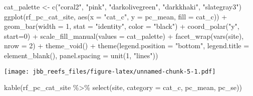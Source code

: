 \documentclass[
]{article}
\newenvironment{Shaded}{\begin{snugshade}}{\end{snugshade}}
\newcommand{\AttributeTok}[1]{\textcolor[rgb]{0.77,0.63,0.00}{#1}}
\newcommand{\DecValTok}[1]{\textcolor[rgb]{0.00,0.00,0.81}{#1}}
\newcommand{\FunctionTok}[1]{\textcolor[rgb]{0.00,0.00,0.00}{#1}}
\newcommand{\NormalTok}[1]{#1}
\newcommand{\OtherTok}[1]{\textcolor[rgb]{0.56,0.35,0.01}{#1}}
\newcommand{\SpecialCharTok}[1]{\textcolor[rgb]{0.00,0.00,0.00}{#1}}
\newcommand{\StringTok}[1]{\textcolor[rgb]{0.31,0.60,0.02}{#1}}
\begin{document}
\begin{Shaded}
\begin{Highlighting}[]
\NormalTok{cat\_palette }\OtherTok{\textless{}{-}} \FunctionTok{c}\NormalTok{(}\StringTok{"coral2"}\NormalTok{, }\StringTok{"pink"}\NormalTok{, }\StringTok{"darkolivegreen"}\NormalTok{, }\StringTok{"darkkhaki"}\NormalTok{, }\StringTok{"slategray3"}\NormalTok{)}
\FunctionTok{ggplot}\NormalTok{(rf\_pc\_cat\_site, }
       \FunctionTok{aes}\NormalTok{(}\AttributeTok{x =} \StringTok{"cat\_c"}\NormalTok{, }\AttributeTok{y =}\NormalTok{ pc\_mean, }\AttributeTok{fill =}\NormalTok{ cat\_c)) }\SpecialCharTok{+} 
  \FunctionTok{geom\_bar}\NormalTok{(}\AttributeTok{width =} \DecValTok{1}\NormalTok{, }\AttributeTok{stat =} \StringTok{"identity"}\NormalTok{, }\AttributeTok{color =} \StringTok{"black"}\NormalTok{) }\SpecialCharTok{+}
  \FunctionTok{coord\_polar}\NormalTok{(}\StringTok{"y"}\NormalTok{, }\AttributeTok{start=}\DecValTok{0}\NormalTok{) }\SpecialCharTok{+}
  \FunctionTok{scale\_fill\_manual}\NormalTok{(}\AttributeTok{values =}\NormalTok{ cat\_palette) }\SpecialCharTok{+}
  \FunctionTok{facet\_wrap}\NormalTok{(}\FunctionTok{vars}\NormalTok{(site), }\AttributeTok{nrow =} \DecValTok{2}\NormalTok{) }\SpecialCharTok{+}
  \FunctionTok{theme\_void}\NormalTok{() }\SpecialCharTok{+}
  \FunctionTok{theme}\NormalTok{(}\AttributeTok{legend.position =} \StringTok{"bottom"}\NormalTok{,}
        \AttributeTok{legend.title =} \FunctionTok{element\_blank}\NormalTok{(),}
        \AttributeTok{panel.spacing =} \FunctionTok{unit}\NormalTok{(}\DecValTok{1}\NormalTok{, }\StringTok{"lines"}\NormalTok{))}
\end{Highlighting}
\end{Shaded}

\texttt{[image: jbb\_reefs\_files/figure-latex/unnamed-chunk-5-1.pdf]}

\begin{Shaded}
\begin{Highlighting}[]
\FunctionTok{kable}\NormalTok{(rf\_pc\_cat\_site }\SpecialCharTok{\%\textgreater{}\%} \FunctionTok{select}\NormalTok{(site, }\AttributeTok{category =}\NormalTok{ cat\_c, pc\_mean, pc\_se))}
\end{Highlighting}
\end{Shaded}
\end{document}
